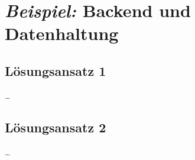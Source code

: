 
\section{\emph{Beispiel:} Backend und Datenhaltung\authorB}



\subsection{Lösungsansatz 1}

\ldots

\subsection{Lösungsansatz 2}

\ldots